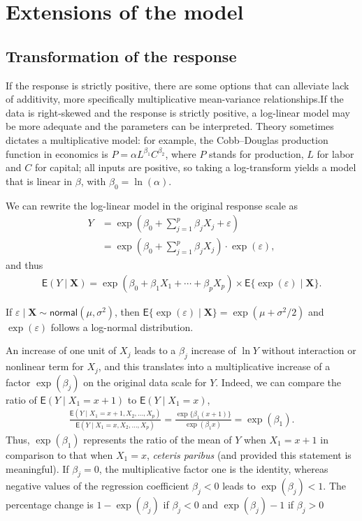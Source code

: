 \documentclass[
  11pt,
  letterpaper,
]{scrbook}
\theoremstyle{definition}
\theoremstyle{definition}
\theoremstyle{plain}
\theoremstyle{plain}
\theoremstyle{remark}
\begin{document}
\section{Extensions of the model}\label{extensions-of-the-model}

\subsection{Transformation of the response}\label{sec-transfo}

If the response is strictly positive, there are some options that can
alleviate lack of additivity, more specifically multiplicative
mean-variance relationships.If the data is right-skewed and the response
is strictly positive, a log-linear model may be more adequate and the
parameters can be interpreted. Theory sometimes dictates a
multiplicative model: for example, the Cobb--Douglas production function
in economics is \(P=\alpha L^{\beta_1}C^{\beta_2}\), where \(P\) stands
for production, \(L\) for labor and \(C\) for capital; all inputs are
positive, so taking a log-transform yields a model that is linear in
\(\beta\), with \(\beta_0=\ln(\alpha)\).

We can rewrite the log-linear model in the original response scale as
\begin{align*}
Y &= \exp\left(\beta_0+\sum_{j=1}^p\beta_jX_j +  \varepsilon \right) \\&= \exp\left(\beta_0+ \sum_{j=1}^p\beta_jX_j\right)\cdot \exp(\varepsilon),
\end{align*} and thus \begin{align*}
\mathsf{E}(Y \mid \mathbf{X}) = \exp(\beta_0 +\beta_1 X_1 +\cdots + \beta_pX_p) \times \mathsf{E}\{\exp(\varepsilon) \mid \mathbf{X}\}.
\end{align*}

If \(\varepsilon \mid \mathbf{X} \sim \mathsf{normal}(\mu,\sigma^2)\),
then
\(\mathsf{E}\{\exp(\varepsilon) \mid \mathbf{X}\}= \exp(\mu+\sigma^2/2)\)
and \(\exp(\varepsilon)\) follows a log-normal distribution.

An increase of one unit of \(X_j\) leads to a \(\beta_j\) increase of
\(\ln Y\) without interaction or nonlinear term for \(X_j\), and this
translates into a multiplicative increase of a factor \(\exp(\beta_j)\)
on the original data scale for \(Y\). Indeed, we can compare the ratio
of \(\mathsf{E}(Y \mid X_1=x+1)\) to \(\mathsf{E}(Y \mid X_1=x)\),
\begin{align*}
\frac{\mathsf{E}(Y \mid X_1=x+1, X_2, \ldots, X_p)}{\mathsf{E}(Y \mid X_1=x,  X_2, \ldots, X_p)} = \frac{\exp\{\beta_1(x+1)\}}{\exp(\beta_1 x)} = \exp(\beta_1).
\end{align*} Thus, \(\exp(\beta_1)\) represents the ratio of the mean of
\(Y\) when \(X_1=x+1\) in comparison to that when \(X_1=x\),
\emph{ceteris paribus} (and provided this statement is meaningful). If
\(\beta_j=0\), the multiplicative factor one is the identity, whereas
negative values of the regression coefficient \(\beta_j<0\) leads to
\(\exp(\beta_j)<1\). The percentage change is \(1-\exp(\beta_j)\) if
\(\beta_j <0\) and \(\exp(\beta_j)-1\) if \(\beta_j>0\)
\end{document}
